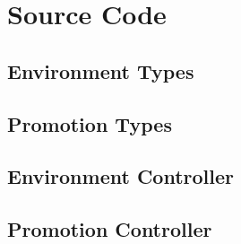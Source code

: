 \chapter{Source Code}\label{appendix:source-code}


\section{Environment Types}



\section{Promotion Types}



\section{Environment Controller}



\section{Promotion Controller}









%
%
%
%
%
%
%
%
%
%
%
%
%
%
%
%
%
%



